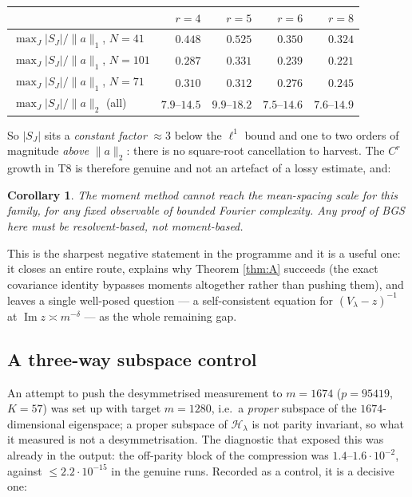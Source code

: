 \documentclass[11pt,reqno]{amsart}
\newtheorem{corollary}[theorem]{Corollary}
\theoremstyle{definition}
\newcommand{\HH}{\mathcal{H}}
\begin{document}
\begin{center}\footnotesize
\begin{tabular}{@{}lrrrr@{}}
\toprule
& $r=4$ & $r=5$ & $r=6$ & $r=8$\\
\midrule
$\max_J|S_J|/\|a\|_1$, $N=41$   & $0.448$ & $0.525$ & $0.350$ & $0.324$\\
$\max_J|S_J|/\|a\|_1$, $N=101$  & $0.287$ & $0.331$ & $0.239$ & $0.221$\\
$\max_J|S_J|/\|a\|_1$, $N=71$   & $0.310$ & $0.312$ & $0.276$ & $0.245$\\
$\max_J|S_J|/\|a\|_2$ (all)     & $7.9$--$14.5$ & $9.9$--$18.2$ & $7.5$--$14.6$ & $7.6$--$14.9$\\
\bottomrule
\end{tabular}
\end{center}

\noindent
So $|S_J|$ sits a \emph{constant factor} $\approx3$ below the $\ell^1$ bound and
one to two orders of magnitude \emph{above} $\|a\|_2$: there is no square-root
cancellation to harvest. The $C^r$ growth in T8 is therefore genuine and not an
artefact of a lossy estimate, and:

\begin{corollary}
The moment method cannot reach the mean-spacing scale for this family, for any
fixed observable of bounded Fourier complexity. Any proof of BGS here must be
resolvent-based, not moment-based.
\end{corollary}

This is the sharpest negative statement in the programme and it is a useful one:
it closes an entire route, explains why Theorem \ref{thm:A} succeeds (the exact
covariance identity bypasses moments altogether rather than pushing them), and
leaves a single well-posed question --- a self-consistent equation for
$(V_\lambda-z)^{-1}$ at $\operatorname{Im}z\asymp m^{-\delta}$ --- as the whole
remaining gap.

\subsection{A three-way subspace control}\label{sub:control}

An attempt to push the desymmetrised measurement to $m=1674$ ($p=95419$, $K=57$)
was set up with target $m=1280$, i.e.\ a \emph{proper} subspace of the
$1674$-dimensional eigenspace; a proper subspace of $\HH_\lambda$ is not parity
invariant, so what it measured is not a desymmetrisation. The diagnostic that
exposed this was already in the output: the off-parity block of the compression
was $1.4$--$1.6\cdot10^{-2}$, against $\le2.2\cdot10^{-15}$ in the genuine runs.
Recorded as a control, it is a decisive one:
\end{document}
